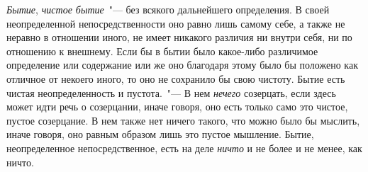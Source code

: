 \emph{Бытие}, \emph{чистое бытие}~"--- без всякого дальнейшего определения.
В своей неопределенной непосредственности оно
равно лишь самому себе, а также не неравно в отношении
иного, не имеет никакого различия ни внутри себя,
ни по отношению к внешнему. Если бы в бытии было
какое-либо различимое определение или содержание или
же оно благодаря этому было бы положено как отличное
от некоего иного, то оно не сохранило бы свою чистоту.
Бытие есть чистая неопределенность и пустота.~"--- В нем
\emph{нечего} созерцать, если здесь может идти речь о созерцании,
иначе говоря, оно есть только само это чистое, пустое
созерцание. В нем также нет ничего такого, что
можно было бы мыслить, иначе говоря, оно равным образом
лишь это пустое мышление. Бытие, неопределенное
непосредственное, есть на деле \emph{ничто} и не более и
не менее, как ничто.

